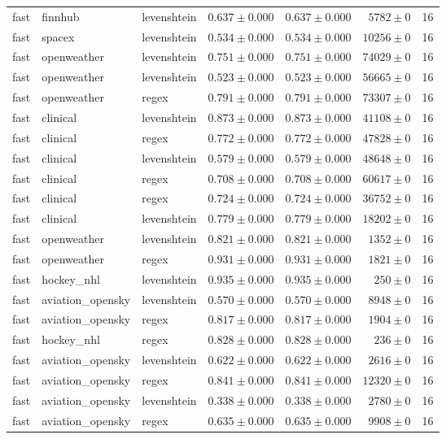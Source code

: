 \begin{table}[htbp]
\begin{tabular}{l l l r r r r}
fast & finnhub & levenshtein & $0.637\pm0.000$ & $0.637\pm0.000$ & $5782\pm0$ & 16 \\
fast & spacex & levenshtein & $0.534\pm0.000$ & $0.534\pm0.000$ & $10256\pm0$ & 16 \\
fast & openweather & levenshtein & $0.751\pm0.000$ & $0.751\pm0.000$ & $74029\pm0$ & 16 \\
fast & openweather & levenshtein & $0.523\pm0.000$ & $0.523\pm0.000$ & $56665\pm0$ & 16 \\
fast & openweather & regex & $0.791\pm0.000$ & $0.791\pm0.000$ & $73307\pm0$ & 16 \\
fast & clinical & levenshtein & $0.873\pm0.000$ & $0.873\pm0.000$ & $41108\pm0$ & 16 \\
fast & clinical & regex & $0.772\pm0.000$ & $0.772\pm0.000$ & $47828\pm0$ & 16 \\
fast & clinical & levenshtein & $0.579\pm0.000$ & $0.579\pm0.000$ & $48648\pm0$ & 16 \\
fast & clinical & regex & $0.708\pm0.000$ & $0.708\pm0.000$ & $60617\pm0$ & 16 \\
fast & clinical & regex & $0.724\pm0.000$ & $0.724\pm0.000$ & $36752\pm0$ & 16 \\
fast & clinical & levenshtein & $0.779\pm0.000$ & $0.779\pm0.000$ & $18202\pm0$ & 16 \\
fast & openweather & levenshtein & $0.821\pm0.000$ & $0.821\pm0.000$ & $1352\pm0$ & 16 \\
fast & openweather & regex & $0.931\pm0.000$ & $0.931\pm0.000$ & $1821\pm0$ & 16 \\
fast & hockey\_nhl & levenshtein & $0.935\pm0.000$ & $0.935\pm0.000$ & $250\pm0$ & 16 \\
fast & aviation\_opensky & levenshtein & $0.570\pm0.000$ & $0.570\pm0.000$ & $8948\pm0$ & 16 \\
fast & aviation\_opensky & regex & $0.817\pm0.000$ & $0.817\pm0.000$ & $1904\pm0$ & 16 \\
fast & hockey\_nhl & regex & $0.828\pm0.000$ & $0.828\pm0.000$ & $236\pm0$ & 16 \\
fast & aviation\_opensky & levenshtein & $0.622\pm0.000$ & $0.622\pm0.000$ & $2616\pm0$ & 16 \\
fast & aviation\_opensky & regex & $0.841\pm0.000$ & $0.841\pm0.000$ & $12320\pm0$ & 16 \\
fast & aviation\_opensky & levenshtein & $0.338\pm0.000$ & $0.338\pm0.000$ & $2780\pm0$ & 16 \\
fast & aviation\_opensky & regex & $0.635\pm0.000$ & $0.635\pm0.000$ & $9908\pm0$ & 16 \\

\end{tabular}
\end{table}
